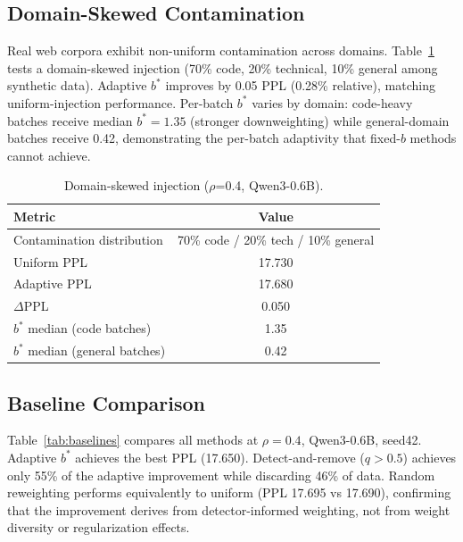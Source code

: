 \documentclass[11pt]{article}
\begin{document}
\subsection{Domain-Skewed Contamination}
\label{sec:domain_skew}

Real web corpora exhibit non-uniform contamination across domains. Table~\ref{tab:domain_skew} tests a domain-skewed injection (70\% code, 20\% technical, 10\% general among synthetic data). Adaptive $b^*$ improves by 0.05 PPL (0.28\% relative), matching uniform-injection performance. Per-batch $b^*$ varies by domain: code-heavy batches receive median $b^*=1.35$ (stronger downweighting) while general-domain batches receive 0.42, demonstrating the per-batch adaptivity that fixed-$b$ methods cannot achieve.

\begin{table}[t]
\centering
\caption{Domain-skewed injection ($\rho$=0.4, Qwen3-0.6B).}
\label{tab:domain_skew}
\small
\begin{tabular}{l c}
\toprule
Metric & Value \\
\midrule
Contamination distribution & 70\% code / 20\% tech / 10\% general \\
Uniform PPL & 17.730 \\
Adaptive PPL & 17.680 \\
$\Delta$PPL & 0.050 \\
$b^*$ median (code batches) & 1.35 \\
$b^*$ median (general batches) & 0.42 \\
\bottomrule
\end{tabular}
\end{table}

\subsection{Baseline Comparison}
\label{sec:baselines}

Table~\ref{tab:baselines} compares all methods at $\rho=0.4$, Qwen3-0.6B, seed42. Adaptive $b^*$ achieves the best PPL (17.650). Detect-and-remove ($q>0.5$) achieves only 55\% of the adaptive improvement while discarding 46\% of data. Random reweighting performs equivalently to uniform (PPL 17.695 vs 17.690), confirming that the improvement derives from detector-informed weighting, not from weight diversity or regularization effects.
\end{document}
